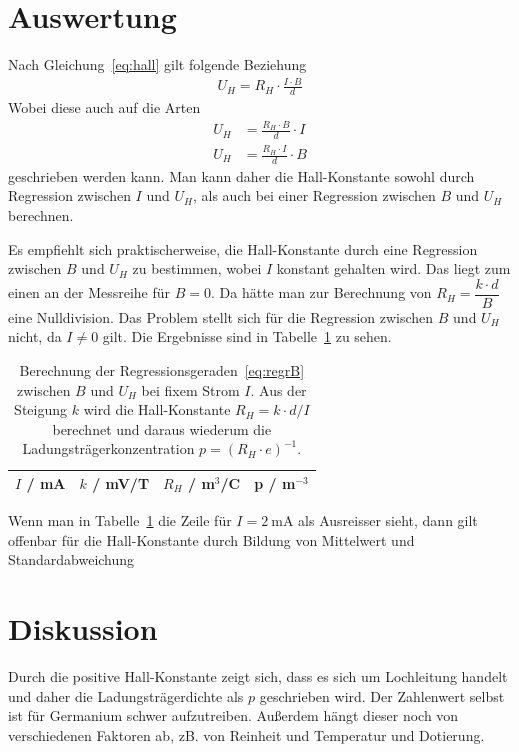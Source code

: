\documentclass{article}
\begin{document}
\section{Auswertung}

Nach Gleichung~\eqref{eq:hall} gilt folgende Beziehung
\begin{align}
U_H = R_H \cdot \frac{I\cdot B}{d}
\end{align}
Wobei diese auch auf die Arten
\begin{align}
U_H &= \frac{R_H\cdot B}{d} \cdot I \label{eq:regrI} \\
U_H &= \frac{R_H\cdot I}{d} \cdot B \label{eq:regrB}
\end{align}
geschrieben werden kann. Man kann daher die Hall-Konstante sowohl durch Regression zwischen $I$ und $U_H$, als auch bei einer Regression zwischen $B$ und $U_H$ berechnen.

Es empfiehlt sich praktischerweise, die Hall-Konstante durch eine Regression zwischen $B$ und $U_H$ zu bestimmen, wobei $I$ konstant gehalten wird. Das liegt zum einen an der Messreihe für $B=0$. Da hätte man zur Berechnung von $R_H = \dfrac{k\cdot d}{B}$ eine Nulldivision. Das Problem stellt sich für die Regression zwischen $B$ und $U_H$ nicht, da $I\neq0$ gilt. Die Ergebnisse sind in Tabelle~\ref{tab:auswertung_B_U} zu sehen.

\begin{table}[H]
\caption{Berechnung der Regressionsgeraden~\eqref{eq:regrB} zwischen $B$ und $U_H$ bei fixem Strom $I$. Aus der Steigung $k$ wird die Hall-Konstante $R_H = k\cdot d/I$ berechnet und daraus wiederum die Ladungsträgerkonzentration $p=(R_H\cdot e)^{-1}$.}
\begin{tabular}{r|r|r|r}
$I$ / mA & $k$ / mV/T & $R_H$ / m$^3$/C & p / m$^{-3}$ \\
\hline

\end{tabular}
\label{tab:auswertung_B_U}
\end{table}

Wenn man in Tabelle~\ref{tab:auswertung_B_U} die Zeile für $I=2~$mA als Ausreisser sieht, dann gilt offenbar für die Hall-Konstante durch Bildung von Mittelwert und Standardabweichung




\section{Diskussion}

Durch die positive Hall-Konstante zeigt sich, dass es sich um Lochleitung handelt und daher die Ladungsträgerdichte als $p$ geschrieben wird. Der Zahlenwert selbst ist für Germanium schwer aufzutreiben. Außerdem hängt dieser noch von verschiedenen Faktoren ab, zB. von Reinheit und Temperatur und Dotierung.
\end{document}
